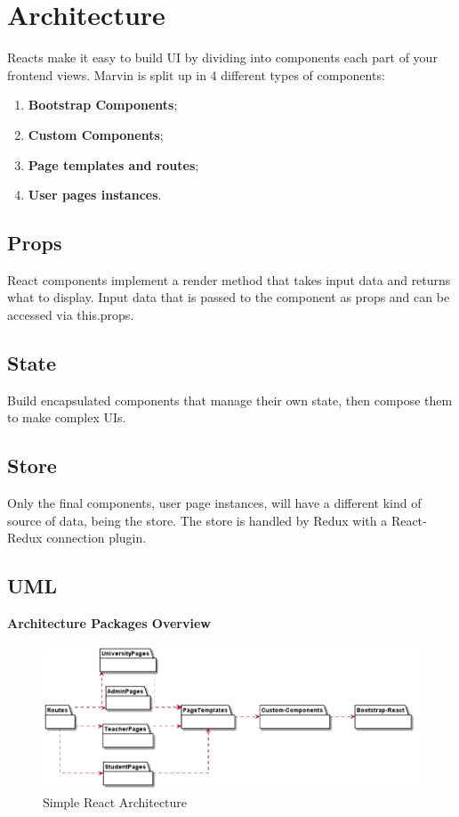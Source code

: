 \documentclass[../react]{subfiles}
\begin{document}
	
	\section{Architecture}

	Reacts make it easy to build UI by dividing into components each part of your frontend views.
	Marvin is split up in 4 different types of components:
	\begin{enumerate} 
		\item \textbf{Bootstrap Components};
		\item \textbf{Custom Components};
		\item \textbf{Page templates and routes};
		\item \textbf{User pages instances}.
	\end{enumerate} 

	\subsection{Props}
	React components implement a render method that takes input data and returns what to display.
	Input data that is passed to the component as props and can be accessed via this.props.

	\subsection{State}
	Build encapsulated components that manage their own state, then compose them to make complex UIs.

	\subsection{Store}
	Only the final components, user page instances, will have a different kind of source of data, being the store.
	The store is handled by Redux with a React-Redux connection plugin.
	
	\subsection{UML} %
	
	\textbf{Architecture Packages Overview}
	\begin{figure}[H]
		\centering
		\includegraphics[width=1\linewidth]{"diagrammi/react/simplearch"}
		\caption{Simple React Architecture}
		\label{fig:Simple React Architecture}
	\end{figure}
	
\end{document}
